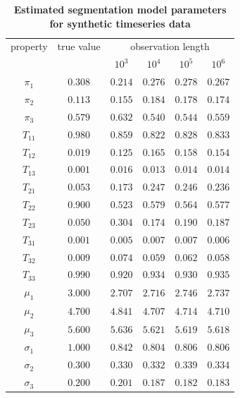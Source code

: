 \documentclass[endfloats,prl,twocolumn,superscriptaddress,nofootinbib,longbibliography]{revtex4-1}
\begin{document}
\begin{table}[tbp]
\eject
\caption{{\bf Estimated segmentation model parameters for synthetic timeseries data}}
\label{table:synthetic-segmentation-model}
\begin{tabular}{|c|c|cccc|}
\hline
property & true value & \multicolumn{4}{c|}{observation length} \\
 & & $10^3$ & $10^4$ & $10^5$ & $10^6$ \\ \hline
$\pi_{1}$ & $0.308$ & $0.214$ & $0.276$ & $0.278$ & $0.267$ \\
$\pi_{2}$ & $0.113$ & $0.155$ & $0.184$ & $0.178$ & $0.174$ \\
$\pi_{3}$ & $0.579$ & $0.632$ & $0.540$ & $0.544$ & $0.559$ \\
\hline
$T_{11}$ & $0.980$ & $0.859$ & $0.822$ & $0.828$ & $0.833$ \\
$T_{12}$ & $0.019$ & $0.125$ & $0.165$ & $0.158$ & $0.154$ \\
$T_{13}$ & $0.001$ & $0.016$ & $0.013$ & $0.014$ & $0.014$ \\
$T_{21}$ & $0.053$ & $0.173$ & $0.247$ & $0.246$ & $0.236$ \\
$T_{22}$ & $0.900$ & $0.523$ & $0.579$ & $0.564$ & $0.577$ \\
$T_{23}$ & $0.050$ & $0.304$ & $0.174$ & $0.190$ & $0.187$ \\
$T_{31}$ & $0.001$ & $0.005$ & $0.007$ & $0.007$ & $0.006$ \\
$T_{32}$ & $0.009$ & $0.074$ & $0.059$ & $0.062$ & $0.058$ \\
$T_{33}$ & $0.990$ & $0.920$ & $0.934$ & $0.930$ & $0.935$ \\
\hline
$\mu_{1}$ & $3.000$ & $2.707$ & $2.716$ & $2.746$ & $2.737$ \\
$\mu_{2}$ & $4.700$ & $4.841$ & $4.707$ & $4.714$ & $4.710$ \\
$\mu_{3}$ & $5.600$ & $5.636$ & $5.621$ & $5.619$ & $5.618$ \\
\hline
$\sigma_{1}$ & $1.000$ & $0.842$ & $0.804$ & $0.806$ & $0.806$ \\
$\sigma_{2}$ & $0.300$ & $0.330$ & $0.332$ & $0.339$ & $0.334$ \\
$\sigma_{3}$ & $0.200$ & $0.201$ & $0.187$ & $0.182$ & $0.183$ \\
\hline
\end{tabular}
\end{table}
\end{document}
